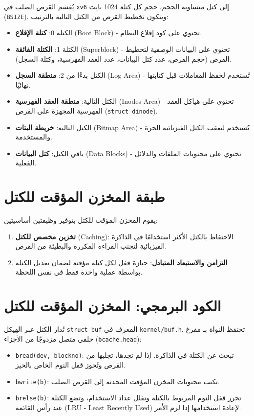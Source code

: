 يُقسم القرص الصلب في \texttt{xv6} إلى كتل متساوية الحجم، حجم كل كتلة 1024 بايت (\texttt{BSIZE}).
ويتكون تخطيط القرص من الكتل التالية بالترتيب:
\begin{itemize}
  \item الكتلة 0: \textbf{كتلة الإقلاع} (Boot Block) - تحتوي على كود إقلاع النظام.
  \item الكتلة 1: \textbf{الكتلة الفائقة} (Superblock) - تحتوي على البيانات الوصفية لتخطيط القرص (حجم القرص، عدد كتل البيانات، عدد العقد الفهرسية، وكتلة السجل).
  \item الكتل بدءًا من 2: \textbf{منطقة السجل} (Log Area) - تُستخدم لحفظ المعاملات قبل كتابتها نهائيًا.
  \item الكتل التالية: \textbf{منطقة العقد الفهرسية} (Inodes Area) - تحتوي على هياكل العقد الفهرسية المجهزة على القرص (\texttt{struct dinode}).
  \item الكتل التالية: \textbf{خريطة البتات} (Bitmap Area) - تُستخدم لتعقب الكتل الفيزيائية الحرة والمستخدمة.
  \item باقي الكتل: \textbf{كتل البيانات} (Data Blocks) - تحتوي على محتويات الملفات والدلائل الفعلية.
\end{itemize}

\section{طبقة المخزن المؤقت للكتل}
\label{sec:buffer_cache_layer}

يقوم المخزن المؤقت للكتل بتوفير وظيفتين أساسيتين:
\begin{enumerate}
  \item \textbf{تخزين مخصص للكتل} (Caching): الاحتفاظ بالكتل الأكثر استخدامًا في الذاكرة الفيزيائية لتجنب القراءة المكررة والبطيئة من القرص.
  \item \textbf{التزامن والاستبعاد المتبادل}: حيازة قفل لكل كتلة مؤقتة لضمان تعديل الكتلة بواسطة عملية واحدة فقط في نفس اللحظة.
\end{enumerate}

\section{الكود البرمجي: المخزن المؤقت للكتل}
\label{sec:code_buffer_cache}

تُدار الكتل عبر الهيكل \texttt{struct buf} المعرف في \texttt{kernel/buf.h}.
تحتفظ النواة بـ مفرغ حلقي متصل مزدوجًا من الأجزاء (\texttt{bcache.head}):
\begin{itemize}
  \item \texttt{bread(dev, blockno)}: تبحث عن الكتلة في الذاكرة. إذا لم تجدها، تجلبها من القرص وتُحوز قفل النوم الخاص بالحيز.
  \item \texttt{bwrite(b)}: تكتب محتويات المخزن المؤقت المحدثة إلى القرص الصلب.
  \item \texttt{brelse(b)}: تحرر قفل النوم المربوط بالكتلة وتقلل عداد الاستخدام، وتضع الكتلة عند رأس القائمة (LRU - Least Recently Used) لإعادة استخدامها إذا لزم الأمر.
\end{itemize}

